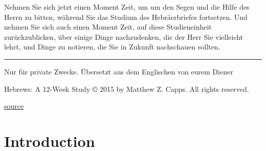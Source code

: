 \documentclass[headsepline=true]{book}
\begin{document}
Nehmen Sie sich jetzt einen Moment Zeit, um um den Segen und die Hilfe
des Herrn zu bitten, während Sie das Studium des Hebräerbriefes
fortsetzen. Und nehmen Sie sich auch einen Moment Zeit, auf diese
Studieneinheit zurückzublicken, über einige Dinge nachzudenken, die der
Herr Sie vielleicht lehrt, und Dinge zu notieren, die Sie in Zukunft
nachschauen sollten.

\begin{center}\rule{0.5\linewidth}{0.5pt}\end{center}

Nur für private Zwecke. Übersetzt aus dem Englischen von eurem Diener

Hebrews: A 12-Week Study © 2015 by Matthew Z. Capps. All rights
reserved.

\href{https://www.thegospelcoalition.org/course/knowing-bible-hebrews/\#week-3-jesus-is-superior-to-angelic-beings-heb-15-218}{source}

\chapter{Introduction}\label{introduction}


\end{document}
